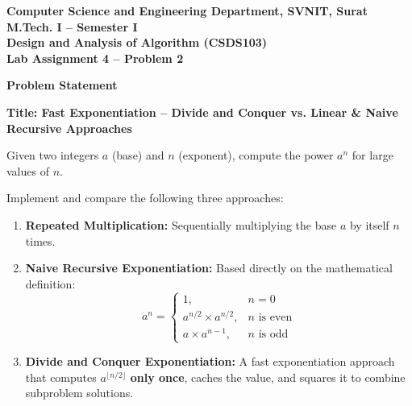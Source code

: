 \documentclass[12pt]{article}
\begin{document}
\newpage


\begin{center}
\textbf{Computer Science and Engineering Department, SVNIT, Surat}\\
\textbf{M.Tech. I -- Semester I}\\
\textbf{Design and Analysis of Algorithm (CSDS103)}\\
\textbf{Lab Assignment 4 -- Problem 2}
\end{center}

\vspace{0.4cm}

\textbf{Problem Statement}

\textbf{Title: Fast Exponentiation -- Divide and Conquer vs. Linear \& Naive Recursive Approaches}

Given two integers $a$ (base) and $n$ (exponent), compute the power $a^n$ for large values of $n$.

Implement and compare the following three approaches:
\begin{enumerate}
    \item \textbf{Repeated Multiplication:} Sequentially multiplying the base $a$ by itself $n$ times.
    \item \textbf{Naive Recursive Exponentiation:} Based directly on the mathematical definition:
    \[
    a^n = 
    \begin{cases} 
    1, & n = 0 \\
    a^{n/2} \times a^{n/2}, & n \text{ is even} \\
    a \times a^{n-1}, & n \text{ is odd}
    \end{cases}
    \]
    \item \textbf{Divide and Conquer Exponentiation:} A fast exponentiation approach that computes $a^{\lfloor n/2 \rfloor}$ \textbf{only once}, caches the value, and squares it to combine subproblem solutions.
\end{enumerate}
\end{document}
